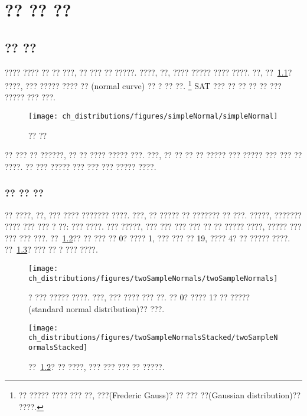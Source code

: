 \chapter{?? ?? ??}
\label{modeling}


\section{?? ??}
\label{normalDist}

???? ???? ?? ?? ???, ?? ??? ?? ?????. ????, ??, ???? ????? ???? ????. ??, ??~\ref{simpleNormal}? ????, ??? ????? ???? ?? (normal curve) ?? ? ?? ??.
\footnote{?? ????? ???? ??? ??, ???(Frederic Gauss)? ?? ??? ??(Gaussian distribution)?? ????.}
SAT ??? ?? ?? ?? ?? ??? ????? ??? ???.

\begin{figure}
\centering
\texttt{[image: ch\_distributions/figures/simpleNormal/simpleNormal]}
\caption{?? ??}
\label{simpleNormal}
\end{figure}

\begin{termBox}{
?? ??? ?? ??????, ?? ?? ???? ????? ???. ???, ?? ?? ?? ?? ????? ??? ????? ??? ??? ?? ????. ?? ??? ????? ??? ??? ??? ????? ????.\vspace{0.7mm}}
\end{termBox}


\subsection{?? ?? ??}

?? ????, ??, ??? ???? ??????? ????. ???, ?? ????? ?? ??????? ?? ???. ?????, ??????? ???? ??? ??? ? ??: ??? ????. ??? ?????, ??? ??? ??? ??? ?? ?? ????? ????, ????? ??? ??? ??? ???. ??~\ref{twoSampleNormals}?? ?? ??? ?? 0? ???? 1, ??? ??? ?? 19, ???? 4? ?? ????? ????. ??~\ref{twoSampleNormalsStacked}? ??? ?? ? ??? ????.

\begin{figure}[hht]
\centering
\texttt{[image: ch\_distributions/figures/twoSampleNormals/twoSampleNormals]}
\caption{? ??? ????? ????. ???, ??? ???? ??? ??. ?? 0? ???? 1? ?? ????? (standard normal distribution)?? ???.}
\label{twoSampleNormals}
\end{figure}

\begin{figure}[hht]
\centering
\texttt{[image: ch\_distributions/figures/twoSampleNormalsStacked/twoSampleNormalsStacked]}
\caption{??~\ref{twoSampleNormals}? ?? ????, ??? ??? ??? ?? ?????.}
\label{twoSampleNormalsStacked}
\end{figure}

